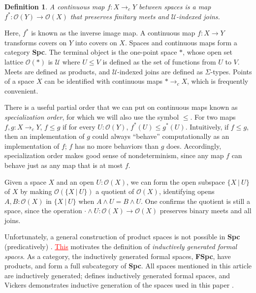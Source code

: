 \documentclass[conference]{IEEEtran}
\newtheorem{definition}{Definition}
\newcommand{\cto}{\to_c}
\newcommand{\Type}{\mathcal{U}}
\newcommand{\suchthat}{\ |\ }
\newcommand{\One}{\ast}
\newcommand{\Open}[1]{\mathcal{O}({#1})}
\newcommand{\iimg}[1]{{#1}^*}
\newcommand{\grammar}[1]{\textcolor{red}{\underline{#1}}}
\begin{document}
\begin{definition}
A \emph{continuous map} $f : X \cto Y$ between spaces is a map $\iimg{f} : \Open{Y} \to \Open{X}$ that preserves finitary meets and $\Type$-indexed joins.
\end{definition}

Here, $\iimg{f}$ is known as the inverse image map. A continuous map $f : X \to Y$ transforms covers on $Y$ into covers on $X$. Spaces and continuous maps form a category \textbf{Spc}. The terminal object is the one-point space $\One$, whose open set lattice $\Open{\One}$ is $\Type$ where $U \le V$ is defined as the set of functions from $U$ to $V$. Meets are defined as products, and $\Type$-indexed joins are defined as $\Sigma$-types. Points of a space $X$ can be identified with continuous maps $\One \cto X$, which is frequently convenient.

There is a useful partial order that we can put on continuous maps known as \emph{specialization order}, for which we will also use the symbol $\le$. For two maps $f, g : X \cto Y$, $f \le g$ if for every $U : \Open{Y}$, $\iimg{f}(U) \le \iimg{g}(U)$. Intuitively, if $f \le g$, then an implementation of $g$ could always ``behave'' computationally as an implementation of $f$; $f$ has no more behaviors than $g$ does. Accordingly, specialization order makes good sense of nondeterminism, since any map $f$ can behave just as any map that is at most $f$.

Given a space $X$ and an open $U : \Open{X}$, we can form the open subspace $\{ X \suchthat U \}$ of $X$ by making $\Open{\{X \suchthat U \}}$ a quotient of $\Open{X}$, identifying opens $A, B : \Open{X}$ in $\{ X \suchthat U \}$ when $A \wedge U = B \wedge U$. One confirms the quotient is still a space, since the operation $\cdot \wedge U : \Open{X} \to \Open{X}$ preserves binary meets and all joins.

Unfortunately, a general construction of product spaces is not possible in \textbf{Spc} (predicatively) \cite{coquand2003}. \grammar{This} motivates the definition of \emph{inductively generated formal spaces}. As a category, the inductively generated formal spaces, \textbf{FSpc}, have products, and form a full subcategory of \textbf{Spc}. All spaces mentioned in this article are inductively generated; \cite{coquand2003} defines inductively generated formal spaces, and Vickers demonstrates inductive generation of the spaces used in this paper \cite{vickersmetric, vickersdoublepowerlocale, SublocFT}.
\end{document}
